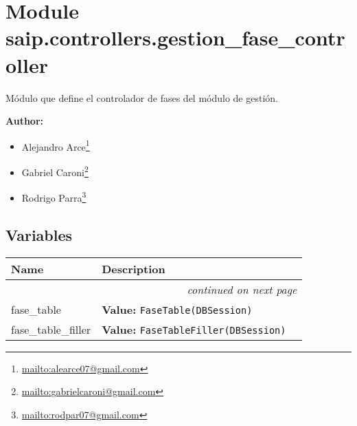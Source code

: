 %
%
%


\section{Module saip.controllers.gestion\_fase\_controller}

    \label{saip:controllers:gestion_fase_controller}
Módulo que define el controlador de fases del módulo de gestión.

\textbf{Author:} \begin{itemize}
\setlength{\parskip}{0.6ex}
  \item Alejandro 
    Arce\footnote{\href{mailto:alearce07@gmail.com}{mailto:alearce07@gmail.com}}

  \item Gabriel 
    Caroni\footnote{\href{mailto:gabrielcaroni@gmail.com}{mailto:gabrielcaroni@gmail.com}}

  \item Rodrigo 
    Parra\footnote{\href{mailto:rodpar07@gmail.com}{mailto:rodpar07@gmail.com}}

\end{itemize}





  \subsection{Variables}

    \vspace{-1cm}
\hspace{\varindent}\begin{longtable}{|p{\varnamewidth}|p{\vardescrwidth}|l}
\cline{1-2}
\cline{1-2} \centering \textbf{Name} & \centering \textbf{Description}& \\
\cline{1-2}
\endhead\cline{1-2}\multicolumn{3}{r}{\small\textit{continued on next page}}\\\endfoot\cline{1-2}
\endlastfoot\raggedright f\-a\-s\-e\-\_\-t\-a\-b\-l\-e\- & \raggedright \textbf{Value:} 
{\tt FaseTable(DBSession)}&\\
\cline{1-2}
\raggedright f\-a\-s\-e\-\_\-t\-a\-b\-l\-e\-\_\-f\-i\-l\-l\-e\-r\- & \raggedright \textbf{Value:} 
{\tt FaseTableFiller(DBSession)}&\\
\cline{1-2}
\end{longtable}


